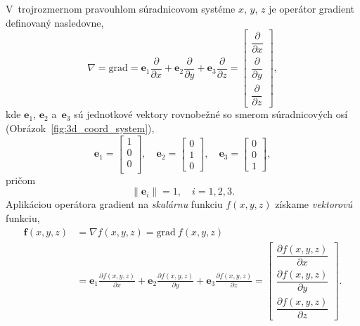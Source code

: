 \documentclass[a4paper,12pt]{book}
\newcommand{\grad}{\mathrm{grad}}
\let\vec\mathbf
\begin{document}
V~trojrozmernom pravouhlom súradnicovom systéme $x$, $y$, $z$ je operátor
gradient definovaný nasledovne,
%
\begin{equation}
\label{eq:gradient}
\nabla = \grad = \vec e_1 \frac{\partial}{\partial x} + \vec e_2
\frac{\partial}{\partial y} + \vec e_3 \frac{\partial}{\partial z} =
\begin{bmatrix}
\dfrac{\partial}{\partial x} \\[2ex]
\dfrac{\partial}{\partial y} \\[2ex]
\dfrac{\partial}{\partial z}
\end{bmatrix}
{,}
\end{equation}
%
kde $\vec e_1$, $\vec e_2$ a~$\vec e_3$ sú jednotkové vektory
rovnobežné so smerom súradnicových osí (Obrázok~\ref{fig:3d_coord_system}),
%
\begin{equation}
\label{eq:unit_vectors}
\vec e_1 =
\begin{bmatrix}
1\\
0\\
0\\
\end{bmatrix}
{,} \quad
%
\vec e_2 =
\begin{bmatrix}
0\\
1\\
0
\end{bmatrix}
%
{,}\quad
%
\vec e_3 =
\begin{bmatrix}
0\\
0\\
1
\end{bmatrix}
{,}
\end{equation}
%
pričom
%
\begin{equation}
\label{eq:unit_vectors_unit_length}
\| \vec e_i \| = 1{,} \quad i = 1, 2,3{.}
\end{equation}
%
Aplikáciou operátora gradient na \emph{skalárnu} funkciu $f(x, y, z)$ získame 
\emph{vektorovú} funkciu,
%
\begin{equation}
\begin{split}
\vec f(x, y, z) &= \nabla f(x, y, z) = \grad \ f(x, y, z)\\
%
&= \vec e_1 \frac{\partial f(x, y, z)}{\partial x} + \vec e_2 \frac{\partial
f(x, y, z)}{\partial y} + \vec e_3 \frac{\partial f(x, y, z)}{\partial z} =
\begin{bmatrix}
\dfrac{\partial f(x, y, z)}{\partial x} \\[2ex]
\dfrac{\partial f(x, y, z)}{\partial y} \\[2ex]
\dfrac{\partial f(x, y, z)}{\partial z}
\end{bmatrix}
{.}
\end{split}
\end{equation}
\end{document}
